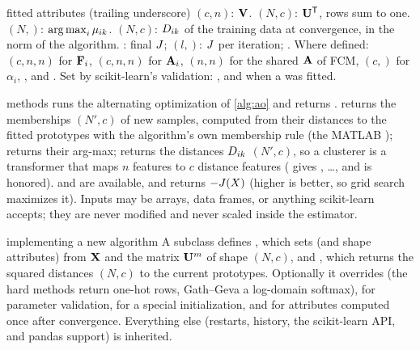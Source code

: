 \begin{apibox}{fitted attributes (\allowbreak trailing underscore)}
 $(c,n)$: $\mathbf{V}$.  $(N,c)$: $\mathbf{U}^{\mathsf{T}}$, rows sum to one.  $(N,)$: $\operatorname{arg\,max}_i\mu_{ik}$.  $(N,c)$: $D_{ik}$ of the training data at convergence, in the norm of the algorithm. : final $J$;  $(l,)$: $J$ per iteration; . Where defined:  $(c,n,n)$ for $\mathbf{F}_i$,  $(c,n,n)$ for $\mathbf{A}_i$,  $(n,n)$ for the shared $\mathbf{A}$ of FCM,  $(c,)$ for $\alpha_i$, , and . Set by scikit-learn's validation: , and  when a  was fitted.
\end{apibox}

\begin{apibox}{methods}
 runs the alternating optimization of \cref{alg:ao} and returns .  returns the memberships $(N',c)$ of new samples, computed from their distances to the fitted prototypes with the algorithm's own membership rule (the MATLAB );  returns their arg-max;  returns the distances $D_{ik}$ $(N',c)$, so a clusterer is a transformer that maps $n$ features to $c$ distance features ( gives , \dots, and  is honored).  and  are available, and  returns $-J(X)$ (higher is better, so grid search maximizes it). Inputs may be  arrays,  data frames, or anything scikit-learn accepts; they are never modified and never scaled inside the estimator.
\end{apibox}

\begin{apibox}{implementing a new algorithm}
A subclass defines , which sets  (and shape attributes) from $\mathbf{X}$ and the matrix $\mathbf{U}^m$ of shape $(N,c)$, and , which returns the squared distances $(N,c)$ to the current prototypes. Optionally it overrides  (the hard methods return one-hot rows, Gath--Geva a log-domain softmax),  for parameter validation,  for a special initialization, and  for attributes computed once after convergence. Everything else (restarts, history, the scikit-learn API, and pandas support) is inherited.
\end{apibox}

